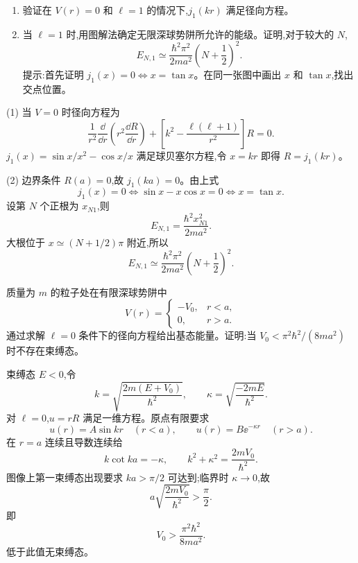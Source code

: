 \begin{question}
\begin{enumerate}
\item 验证在 $V(r)=0$ 和 $\ell=1$ 的情况下,$j_1(kr)$ 满足径向方程。
\item 当 $\ell=1$ 时,用图解法确定无限深球势阱所允许的能级。证明,对于较大的 $N$,
\[
E_{N,1}\simeq \frac{\hbar^2\pi^2}{2ma^2}\left(N+\frac12\right)^2.
\]
提示:首先证明 $j_1(x)=0 \Leftrightarrow x=\tan x$。在同一张图中画出 $x$ 和 $\tan x$,找出交点位置。
\end{enumerate}
\end{question}
\begin{solution}

(1) 当 $V=0$ 时径向方程为
\[
\frac{1}{r^2}\frac{\dd}{\dd r}\left(r^2\frac{\dd R}{\dd r}\right)+\left[k^2-\frac{\ell(\ell+1)}{r^2}\right]R=0.
\]
$j_1(x)=\sin x/x^2-\cos x/x$ 满足球贝塞尔方程,令 $x=kr$ 即得 $R=j_1(kr)$。

(2) 边界条件 $R(a)=0$,故 $j_1(ka)=0$。由上式
\[
j_1(x)=0\iff \sin x-x\cos x=0\iff x=\tan x.
\]
设第 $N$ 个正根为 $x_{N1}$,则
\[
E_{N,1}=\frac{\hbar^2x_{N1}^2}{2ma^2}.
\]
大根位于 $x\simeq (N+1/2)\pi$ 附近,所以
\[
E_{N,1}\simeq\frac{\hbar^2\pi^2}{2ma^2}\left(N+\frac12\right)^2.
\]

\end{solution}

\begin{question}
质量为 $m$ 的粒子处在有限深球势阱中
\[
V(r)=\begin{cases}
-V_0, & r<a,\\
0, & r>a.
\end{cases}
\]
通过求解 $\ell=0$ 条件下的径向方程给出基态能量。证明:当 $V_0<\pi^2\hbar^2/(8ma^2)$ 时不存在束缚态。
\end{question}
\begin{solution}

束缚态 $E<0$,令
\[
k=\sqrt{\frac{2m(E+V_0)}{\hbar^2}},\qquad \kappa=\sqrt{\frac{-2mE}{\hbar^2}}.
\]
对 $\ell=0$,$u=rR$ 满足一维方程。原点有限要求
\[
u(r)=A\sin kr\quad (r<a),
\qquad u(r)=B\ee^{-\kappa r}\quad (r>a).
\]
在 $r=a$ 连续且导数连续给
\[
k\cot ka=-\kappa,
\qquad k^2+\kappa^2=\frac{2mV_0}{\hbar^2}.
\]
图像上第一束缚态出现要求 $ka>\pi/2$ 可达到;临界时 $\kappa\to0$,故
\[
a\sqrt{\frac{2mV_0}{\hbar^2}}>\frac{\pi}{2}.
\]
即
\[
V_0>\frac{\pi^2\hbar^2}{8ma^2}.
\]
低于此值无束缚态。

\end{solution}


